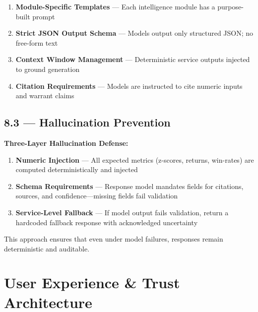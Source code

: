 \documentclass[11pt,a4paper]{article}
\begin{document}
\begin{enumerate}[label={\color{mn-blue}\textbf{Rule \arabic*}}, leftmargin=1.8cm]
    \item \textbf{Module-Specific Templates} — Each intelligence module has a purpose-built prompt
    \item \textbf{Strict JSON Output Schema} — Models output only structured JSON; no free-form text
    \item \textbf{Context Window Management} — Deterministic service outputs injected to ground generation
    \item \textbf{Citation Requirements} — Models are instructed to cite numeric inputs and warrant claims
\end{enumerate}

\subsection{8.3 — Hallucination Prevention}

\begin{tcolorbox}[colback=mn-error!10, colframe=mn-error, arc=1mm, boxsep=8pt]
\small

\textbf{Three-Layer Hallucination Defense:}

\begin{enumerate}[label={\textcolor{mn-error}{\textbf{\arabic1}}}]
    \item \textbf{Numeric Injection} — All expected metrics (z-scores, returns, win-rates) are computed deterministically and injected
    \item \textbf{Schema Requirements} — Response model mandates fields for citations, sources, and confidence—missing fields fail validation
    \item \textbf{Service-Level Fallback} — If model output fails validation, return a hardcoded fallback response with acknowledged uncertainty
\end{enumerate}

\end{tcolorbox}

\vspace{0.5cm}

This approach ensures that even under model failures, responses remain deterministic and auditable.

\section{User Experience \& Trust Architecture}
\end{document}
